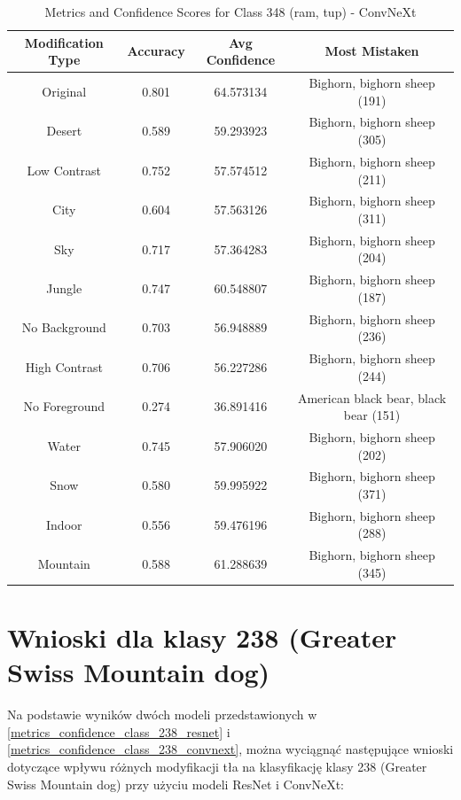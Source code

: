 \begin{table}
	\centering
	\begin{tabular}{|c|c|c|c|}
		\hline
		\textbf{Modification Type} & \textbf{Accuracy} & \textbf{Avg Confidence} & \textbf{Most Mistaken} \\
		\hline
		Original & 0.801 & 64.573134 & Bighorn, bighorn sheep (191) \\
		\hline
		Desert & 0.589 & 59.293923 & Bighorn, bighorn sheep (305) \\
		\hline
		Low Contrast & 0.752 & 57.574512 & Bighorn, bighorn sheep (211) \\
		\hline
		City & 0.604 & 57.563126 & Bighorn, bighorn sheep (311) \\
		\hline
		Sky & 0.717 & 57.364283 & Bighorn, bighorn sheep (204) \\
		\hline
		Jungle & 0.747 & 60.548807 & Bighorn, bighorn sheep (187) \\
		\hline
		No Background & 0.703 & 56.948889 & Bighorn, bighorn sheep (236) \\
		\hline
		High Contrast & 0.706 & 56.227286 & Bighorn, bighorn sheep (244) \\
		\hline
		No Foreground & 0.274 & 36.891416 & American black bear, black bear (151) \\
		\hline
		Water & 0.745 & 57.906020 & Bighorn, bighorn sheep (202) \\
		\hline
		Snow & 0.580 & 59.995922 & Bighorn, bighorn sheep (371) \\
		\hline
		Indoor & 0.556 & 59.476196 & Bighorn, bighorn sheep (288) \\
		\hline
		Mountain & 0.588 & 61.288639 & Bighorn, bighorn sheep (345) \\
		\hline
	\end{tabular}
	\caption{Metrics and Confidence Scores for Class 348 (ram, tup) - ConvNeXt}
	\label{tab:metrics_confidence_class_348_convnext}
\end{table}

\section*{Wnioski dla klasy 238 (Greater Swiss Mountain dog)}

Na podstawie wyników dwóch modeli przedstawionych w \ref*{metrics_confidence_class_238_resnet} i \ref*{metrics_confidence_class_238_convnext}, można wyciągnąć następujące wnioski dotyczące wpływu różnych 
modyfikacji tła na klasyfikację klasy 238 (Greater Swiss Mountain dog) przy użyciu modeli ResNet i ConvNeXt:

